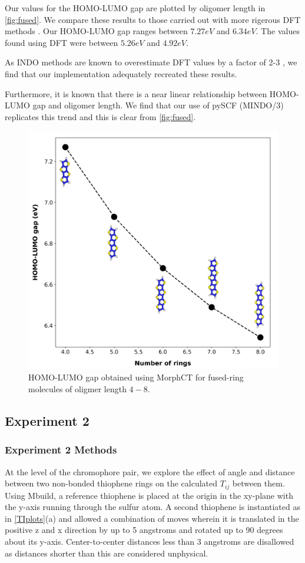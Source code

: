 Our values for the HOMO-LUMO gap are plotted by oligomer length in \autoref{fig:fused}. We compare these
results to those carried out with more rigerous DFT methods \cite{Arago2010}. Our HOMO-LUMO gap ranges between
$7.27eV$ and $6.34eV$. The values found using DFT were between $5.26eV$ and $4.92eV$. 

As INDO methods are known to overestimate DFT values by a factor of 2-3 \cite{Gorelsky2001}, we find that our
implementation adequately recreated these results.

Furthermore, it is known that there is a near linear
relationship between HOMO-LUMO gap and oligomer length. We find that our use of pySCF (MINDO/3) replicates
this trend and this is clear from \autoref{fig:fused}.

\begin{figure}
  \center
  \includegraphics[width = .8\textwidth]{figures/fused-ring-figure.png}
  \caption{HOMO-LUMO gap obtained using MorphCT for fused-ring molecules of oligmer length $4-8$.}
  \label{fig:fused}
\end{figure}

\subsection{Experiment 2}

\subsubsection{Experiment 2 Methods}

At the level of the chromophore pair, we explore the effect of angle and distance between two non-bonded
thiophene rings on the calculated $T_{ij}$ between them.
Using Mbuild, a reference thiophene is placed at the origin in the xy-plane
with the y-axis running through the sulfur atom. 
A second thiophene is instantiated as in \autoref{TIplots}(a)
and allowed a combination of moves wherein it is translated
in the positive z and x direction by up to 5 angstroms 
and rotated up to 90 degrees about its y-axis. Center-to-center distances less
than 3 angstroms are disallowed as distances shorter than this are considered
unphysical.

